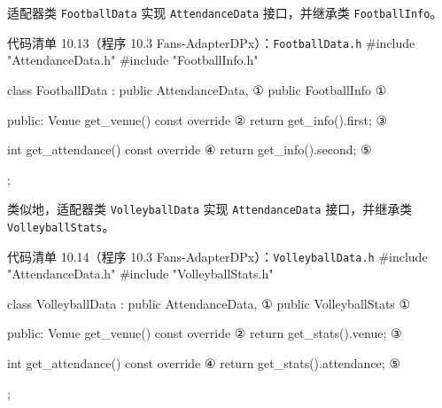 适配器类 \texttt{Football\allowbreak{}Data} 实现 \texttt{Attendance\allowbreak{}Data} 接口，并继承类 \texttt{Football\allowbreak{}Info}。

\begin{codeboxt}{代码清单 10.13（程序 10.3 Fans-AdapterDPx）：\texttt{Football\allowbreak{}Data.\allowbreak{}h}}
#include "AttendanceData.h"
#include "FootballInfo.h"

class FootballData : public AttendanceData, ①
                     public FootballInfo    ①
{
public:
    Venue get_venue() const override        ②
    {
        return get_info().first;            ③
    }

    int get_attendance() const override     ④
    {
        return get_info().second;           ⑤
    }
};
\end{codeboxt}
\par
{}\par
{}\par
{}\par
{}\par

类似地，适配器类 \texttt{Volleyball\allowbreak{}Data} 实现 \texttt{Attendance\allowbreak{}Data} 接口，并继承类 \texttt{Volleyball\allowbreak{}Stats}。

\begin{codeboxt}{代码清单 10.14（程序 10.3 Fans-AdapterDPx）：\texttt{Volleyball\allowbreak{}Data.\allowbreak{}h}}
#include "AttendanceData.h"
#include "VolleyballStats.h"

class VolleyballData : public AttendanceData, ①
                       public VolleyballStats ①
{
public:
    Venue get_venue() const override          ②
    {
        return get_stats().venue;             ③
    }

    int get_attendance() const override       ④
    {
        return get_stats().attendance;        ⑤
    }
};
\end{codeboxt}
\par
{}\par
{}\par
{}\par
{}\par


